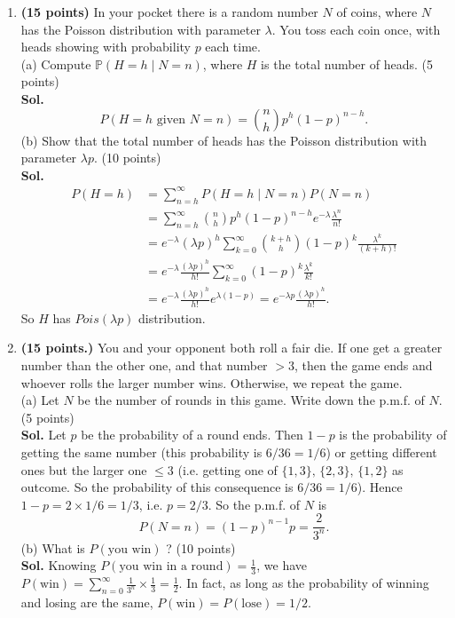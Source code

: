 \begin{enumerate}
    \item \textbf{(15 points)} In your pocket there is a random number $N$ of coins, where $N$ has the Poisson distribution with parameter $\lambda$. You toss each coin once, with heads showing with probability $p$ each time.\\
    (a) Compute $\mathbb{P}(H=h\mid N=n)$, where $H$ is the total number of heads. (5 points) \\
    \textbf{Sol.}
    \begin{equation*}
    P(H=h \text{ given } N=n)=\binom{n}{h}p^h(1-p)^{n-h}.
    \end{equation*}
    (b) Show that the total number of heads has the Poisson distribution with parameter $\lambda p$. (10 points) \\
    \textbf{Sol.}
    \begin{equation*}
    \begin{aligned}
    P(H=h)&=\sum_{n=h}^\infty P(H=h\mid N=n)P(N=n) \\&
    =\sum_{n=h}^\infty 
    \binom{n}{h}p^h(1-p)^{n-h}e^{-\lambda}\frac{\lambda^n}{n!} \\&
    =e^{-\lambda}(\lambda p)^h\sum_{k=0}^\infty\binom{k+h}{h}(1-p)^{k}\frac{\lambda^k}{(k+h)!} \\&
    =e^{-\lambda}\frac{(\lambda p)^h}{h!}\sum_{k=0}^\infty(1-p)^{k}\frac{\lambda^k}{k!} \\&
    =e^{-\lambda}\frac{(\lambda p)^h}{h!}e^{\lambda(1-p)}=e^{-\lambda p}\frac{(\lambda p)^h}{h!}.
    \end{aligned}
    \end{equation*}
    So $H$ has $Pois(\lambda p)$ distribution.
    \item \textbf{(15 points.)} You and your opponent both roll a fair die. If one get a greater number than the other one, and that number $>3$, then the game ends and whoever rolls the larger number wins. Otherwise, we repeat the game.\\
    (a) Let $N$ be the number of rounds in this game. Write down the p.m.f. of $N$. (5 points) \\
    \textbf{Sol.} Let $p$ be the probability of a round ends. Then $1-p$ is the probability of getting the same number (this probability is $6/36=1/6$) or getting different ones but the larger one $\leq 3$ (i.e. getting one of $\{1,3\},\,\{2,3\},\,\{1,2\}$ as outcome. So the probability of this consequence is $6/36=1/6$). Hence $1-p=2\times 1/6=1/3$, i.e. $p=2/3$. So the p.m.f. of $N$ is
    \begin{equation*}
    P(N=n)=(1-p)^{n-1}p=\frac{2}{3^n}.
    \end{equation*}
    (b) What is $P(\text{you win})$ ? (10 points)\\
    \textbf{Sol.} Knowing $P(\text{you win in a round})=\frac{1}{3}$, we have $P(\text{win})=\sum_{n= 0}^\infty\frac{1}{3^n}\times\frac{1}{3}=\frac{1}{2}$. In fact, as long as the probability of winning and losing are the same, $P(\text{win})=P(\text{lose})=1/2$.


\end{enumerate}
